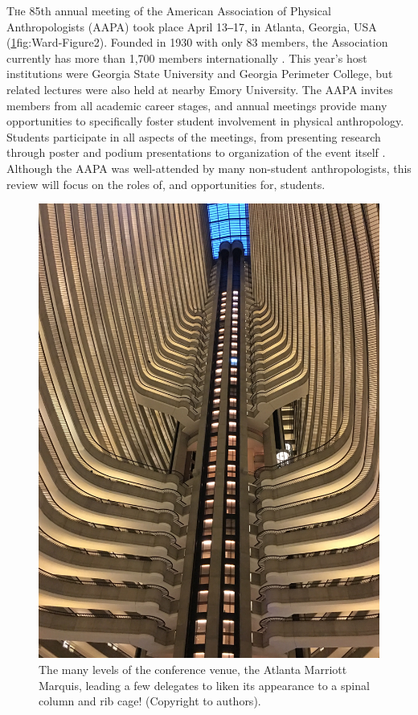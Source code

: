 \documentclass[english]{ijsra}
\begin{document}
\IJSRAopening%


\lettrine{T}he  85th annual meeting of the American Association of Physical Anthropologists (AAPA)
took place April 13‒17, in Atlanta, Georgia, USA (\cref{fig:Ward-Figure1}{fig:Ward-Figure2}).
Founded in 1930 with only 83 members, the Association currently has more than 1,700 members internationally \parencite{american association of physical anthropologists_2016}.
This year’s host institutions were Georgia State University and Georgia Perimeter College,
but related lectures were also held at nearby Emory University.
The AAPA invites members from all academic career stages, and annual meetings provide many opportunities to
specifically foster student involvement in physical anthropology.
Students participate in all aspects of the meetings, from presenting research through poster and
podium presentations to organization of the event itself \parencite{beasley_2016}.
Although the AAPA was well-attended by many non-student anthropologists, this review will focus on the roles of,
and opportunities for, students.

\begin{figure} %
		\includegraphics[width=\linewidth]{figures/Ward-Figure1}
		\caption{The many levels of the conference venue, the Atlanta Marriott Marquis, leading a few delegates to liken its appearance to a spinal column and rib cage! (Copyright to authors).}
		\centering
		\label{fig:Ward-Figure1}
	\end{figure}
\end{document}
